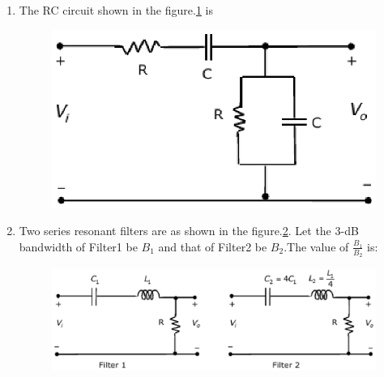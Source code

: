 \documentclass[journal,12pt,twocolumn]{IEEEtran}
\begin{document}
\begin{enumerate}
\item The RC circuit shown in the figure.\ref{fig65} is
\begin{enumerate}
\setlength\itemsep{2em}
\begin{figure}[!h]
\begin{center}
\includegraphics[scale=0.7]{./figs/fig65.eps}
\caption{}
\label{fig65}
\end{center}
\end{figure}
\end{enumerate}

\item Two series resonant filters are as shown in the figure.\ref{fig66}. Let the 3-dB bandwidth of
Filter1 be $B_{1}$ and that of Filter2 be $B_{2}$.The value of $\frac{B_{1}}{B_{2}}$ is:
\begin{enumerate}
\setlength\itemsep{2em}
\begin{figure}[!h]
\begin{center}
\includegraphics[scale=0.5]{./figs/fig66.eps}
\caption{}
\label{fig66}
\end{center}
\end{figure}
\end{enumerate}


\end{enumerate}
\end{document}
